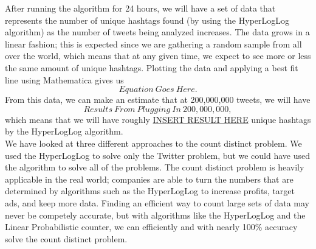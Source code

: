 \documentclass{article}
\begin{document}
After running the algorithm for 24 hours, we will have a set of data that represents the number of unique hashtags found (by using the HyperLogLog algorithm) as the number of tweets being analyzed increases.
The data grows in a linear fashion; this is expected since we are gathering a random sample from all over the world, which means that at any given time, we expect to see more or less the same amount of unique hashtags.
Plotting the data and applying a best fit line using Mathematica gives us
\[
Equation\ Goes\ Here.
\]
From this data, we can make an estimate that at 200,000,000 tweets, we will have
\[
Results\ From\ Plugging\ In\ 200,000,000,
\]
which means that we will have roughly \underline{INSERT RESULT HERE} unique hashtags by the HyperLogLog algorithm.\\ 
\indent We have looked at three different approaches to the count distinct problem. 
We used the HyperLogLog to solve only the Twitter problem, but we could have used the algorithm to solve all of the problems. 
The count distinct problem is heavily applicable in the real world; companies are able to turn the numbers that are determined by algorithms such as the HyperLogLog to increase profits, target ads, and keep more data.
Finding an efficient way to count large sets of data may never be competely accurate, but with algorithms like the HyperLogLog and the Linear Probabilistic counter, we can efficiently and with nearly 100\% accuracy solve the count distinct problem.
\end{document}
